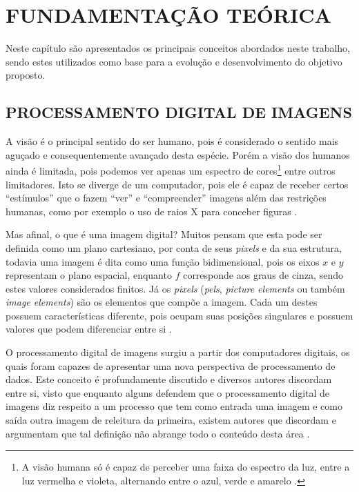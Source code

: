 
\chapter{FUNDAMENTAÇÃO TEÓRICA}
\label{chap:fundamentacao}
Neste capítulo são apresentados os principais conceitos abordados neste trabalho, sendo estes utilizados como base para a evolução e desenvolvimento do objetivo proposto.

\section{PROCESSAMENTO DIGITAL DE IMAGENS}
\label{sec:procimagens}

\par A visão é o principal sentido do ser humano, pois é considerado o sentido mais aguçado e consequentemente avançado desta espécie. Porém a visão dos humanos ainda é limitada, pois podemos ver apenas um espectro de cores\footnote{A visão humana só é capaz de perceber uma faixa do espectro da luz, entre a luz vermelha e violeta, alternando entre o azul, verde e amarelo \cite{Gonzalez2000}.} entre outros limitadores. Isto se diverge de um computador, pois ele é capaz de receber certos ``estímulos'' que o fazem ``ver'' e ``compreender'' imagens além das restrições humanas, como por exemplo o uso de raios X para conceber figuras \cite{Gonzalez2009}.
\par Mas afinal, o que é uma imagem digital? Muitos pensam que esta pode ser definida como um plano cartesiano, por conta de seus \textit{pixels} e da sua estrutura, todavia uma imagem é dita como uma função bidimensional, pois os eixos $x$ e $y$ representam o plano espacial, enquanto $f$ corresponde aos graus de cinza, sendo estes valores considerados finitos. Já os \textit{pixels} (\textit{pels}, \textit{picture elements} ou também \textit{image elements}) são os elementos que compõe a imagem. Cada um destes possuem características diferente, pois ocupam suas posições singulares e possuem valores que podem diferenciar entre si \cite{Gonzalez2009}.

\par O processamento digital de imagens surgiu a partir dos computadores digitais, os quais foram capazes de apresentar uma nova perspectiva de processamento de dados. Este conceito é profundamente discutido e diversos autores discordam entre si, visto que enquanto alguns defendem que o processamento digital de imagens diz respeito a um processo que tem como entrada uma imagem e como saída outra imagem de releitura da primeira, existem autores que discordam e argumentam que tal definição não abrange todo o conteúdo desta área \cite{Gonzalez2009}.
 
